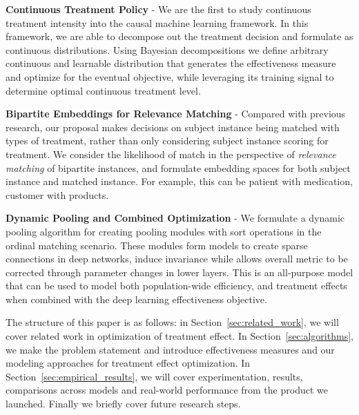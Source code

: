 \documentclass{article}
\begin{document}
\textbf{Continuous Treatment Policy } - We are the first to study continuous treatment intensity into the causal machine learning framework. In this framework, we are able to decompose out the treatment decision and formulate as continuous distributions. Using Bayesian decompositions we define arbitrary continuous and learnable distribution that generates the effectiveness measure and optimize for the eventual objective, while leveraging its training signal to determine optimal continuous treatment level. 

\textbf{Bipartite Embeddings for Relevance Matching} - Compared with previous research, our proposal makes decisions on subject instance being matched with types of treatment, rather than only considering subject instance scoring for treatment. We consider the likelihood of match in the perspective of \emph{relevance matching} of bipartite instances, and formulate embedding spaces for both subject instance and matched instance. For example, this can be patient with medication, customer with products. 

\textbf{Dynamic Pooling and Combined Optimization} - We formulate a dynamic pooling algorithm for creating pooling modules with sort operations in the ordinal matching scenario. These modules form models to create sparse connections in deep networks, induce invariance while allows overall metric to be corrected through parameter changes in lower layers. This is an all-purpose model that can be used to model both population-wide efficiency, and treatment effects when combined with the deep learning effectiveness objective. 

The structure of this paper is as follows: in Section~\ref{sec:related_work}, we will cover related work in optimization of treatment effect. In Section~\ref{sec:algorithms}, we make the problem statement and introduce effectiveness measures and our modeling approaches for treatment effect optimization. In Section~\ref{sec:empirical_results}, we will cover experimentation, results, comparisons across models and real-world performance from the product we launched. Finally we briefly cover future research steps. 
\end{document}
